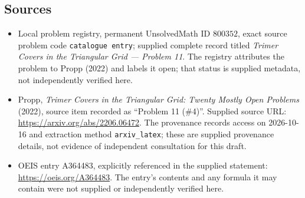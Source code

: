 \documentclass[11pt]{article}
\begin{document}
\subsection{Sources}
\begin{itemize}
\item Local problem registry, permanent UnsolvedMath ID \(800352\), exact source problem code \texttt{catalogue entry}; supplied complete record titled \emph{Trimer Covers in the Triangular Grid --- Problem 11}. The registry attributes the problem to Propp (2022) and labels it open; that status is supplied metadata, not independently verified here.
\item Propp, \emph{Trimer Covers in the Triangular Grid: Twenty Mostly Open Problems} (2022), source item recorded as ``Problem 11 (\#4)''. Supplied source URL: \url{https://arxiv.org/abs/2206.06472}. The provenance records access on 2026-10-16 and extraction method \texttt{arxiv\_latex}; these are supplied provenance details, not evidence of independent consultation for this draft.
\item OEIS entry A364483, explicitly referenced in the supplied statement: \url{https://oeis.org/A364483}. The entry's contents and any formula it may contain were not supplied or independently verified here.
\end{itemize}
\end{document}
